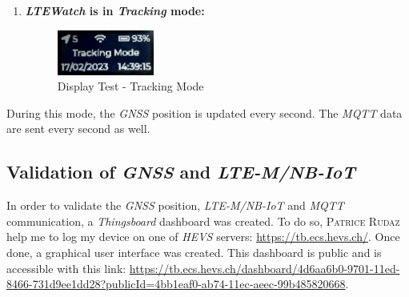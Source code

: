 \documentclass[Report.tex]{subfiles}
\begin{document}
\begin{enumerate}
\begin{itemize}
\item Click \textit{BT0}: Update time and date value with \textit{GNSS} receiver's data
\item Double Click \textit{BT2}: Change battery level unit (\si{\milli\volt}/\si{\percent})
\item Triple Click \textit{BT2}: Reset battery charger configuration
\item Long Press \textit{BT0}: Change active mode (\textit{Normal/Tracking})
\end{itemize}
\item \textbf{\textit{LTEWatch} is in \textit{Tracking} mode:}
\begin{figure}[H]
	\centering
	\includegraphics[width=0.3\textwidth]{Include/Figure/modification/display_11}
	\caption{Display Test - Tracking Mode}
	\label{fig:tracking_exemple_1}
\end{figure}
\end{enumerate}
During this mode, the \textit{GNSS} position is updated every second. The \textit{MQTT} data are sent every second as well. 

\pagebreak

\subsection{Validation of \textit{GNSS} and \textit{LTE-M/NB-IoT}}

In order to validate the \textit{GNSS} position, \textit{LTE-M/NB-IoT} and \textit{MQTT} communication, a \textit{Thingsboard} dashboard was created. To do so, \textsc{Patrice Rudaz} help me to log my device on one of \textit{HEVS} servers: \url{https://tb.ecs.hevs.ch/}. Once done, a graphical user interface was created. This dashboard is public and is accessible with this link: \url{https://tb.ecs.hevs.ch/dashboard/4d6aa6b0-9701-11ed-8466-731d9ee1dd28?publicId=4bb1eaf0-ab74-11ec-aeec-99b485820668}.\\
\end{document}
